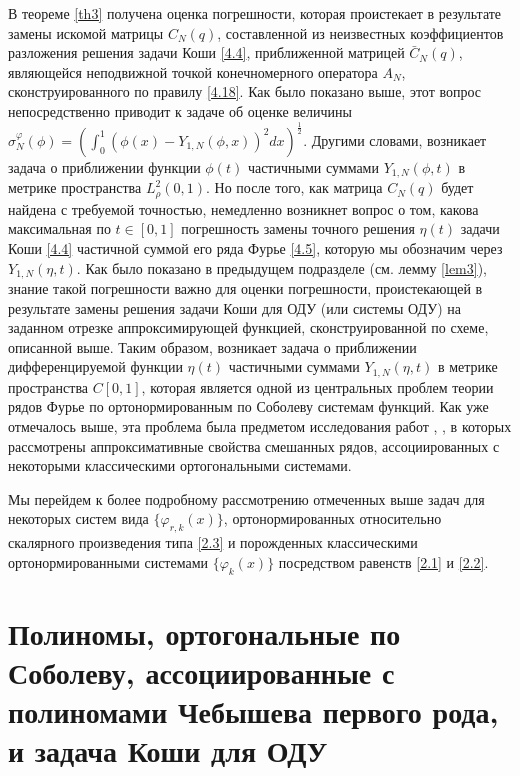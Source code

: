 В теореме \ref{th3} получена оценка  погрешности, которая проистекает в результате замены искомой матрицы $C_N(q)$, составленной из неизвестных коэффициентов  разложения решения задачи Коши \eqref{4.4}, приближенной матрицей $\bar C_N(q)$, являющейся неподвижной точкой конечномерного оператора $A_N$, сконструированного по правилу \eqref{4.18}.
Как было показано выше, этот вопрос непосредственно приводит к задаче об оценке величины  $\sigma_N^\varphi(\phi)=(\int_{0}^1(\phi(x)- Y_{1,N}(\phi,x))^2 dx)^\frac12$. Другими словами, возникает задача о приближении функции $\phi(t)$ частичными суммами $Y_{1,N}(\phi,t)$  в метрике пространства $L^2_\rho(0,1)$.
Но после того, как  матрица $C_N(q)$ будет найдена с требуемой точностью, немедленно возникнет вопрос о том, какова максимальная по $t\in[0,1]$ погрешность замены точного решения $\eta(t)$ задачи Коши \eqref{4.4} частичной суммой его ряда Фурье \eqref{4.5}, которую мы обозначим через  $Y_{1,N}(\eta,t)$. Как было показано в предыдущем подразделе (см. лемму \ref{lem3}), знание такой погрешности важно для оценки погрешности, проистекающей в результате замены решения задачи Коши для ОДУ (или системы ОДУ) на заданном отрезке  аппроксимирующей функцией, сконструированной по схеме, описанной выше.  Таким образом, возникает задача о приближении  дифференцируемой функции $\eta(t)$ частичными суммами $Y_{1,N}(\eta,t)$ в метрике пространства $C[0,1]$, которая является одной из центральных проблем теории рядов Фурье по ортонормированным по Соболеву системам функций. Как уже отмечалось выше, эта проблема  была предметом исследования  работ  \cite{Shar11,Shar2003,Shar2006,Shar2008,Shar19,Shar18,sharap3,Shar_Dag_Elec,SHII,Shar2017,SharSMJ2017}, \cite{SharIzv2018},  в которых  рассмотрены аппроксимативные свойства смешанных рядов, ассоциированных с некоторыми классическими ортогональными системами.

Мы перейдем к более подробному рассмотрению отмеченных выше задач для некоторых  систем вида $\{\varphi_{r,k}(x)\}$, ортонормированных относительно скалярного произведения типа \eqref{2.3} и порожденных классическими ортонормированными системами $\{\varphi_k(x)\}$ посредством равенств  \eqref{2.1} и \eqref{2.2}.







\chapter{Полиномы, ортогональные по Соболеву, ассоциированные с полиномами Чебышева первого рода, и задача Коши для ОДУ}

